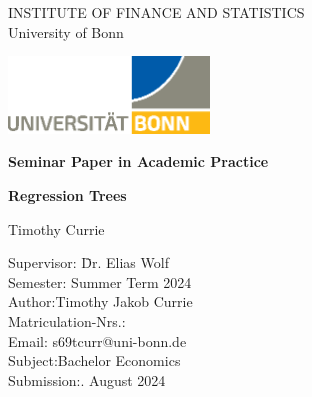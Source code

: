 \thispagestyle{empty}

\begin{center}

    \vspace*{-8mm}

    {\LARGE INSTITUTE OF FINANCE AND STATISTICS\\[1mm]}
    \large University of Bonn\\

    \vspace*{1cm}

    \includegraphics[width=0.4\textwidth]{./Graphics/UNI_Bonn_Logo_Standard_RZ.eps}

    \vspace*{1cm}

    {\Large \textbf{Seminar Paper in Academic Practice}}\\

    \vspace{1cm}

    {\Large \textbf{Regression Trees}}\\
    \vspace{1.5cm}

    {\LARGE Timothy Currie}\\[15mm]

    \parbox{120mm} {
        \begin{large}
            \begin{tabbing}
                Supervisor: \hspace{1.8cm} \= Dr. Elias Wolf\\[1.5mm]
                Semester:\> Summer Term 2024\\[1.5mm]
                Author:\>Timothy Jakob Currie\\[1.5mm] %
                Matriculation-Nrs.:\\[1.5mm]
                Email:\> s69tcurr@uni-bonn.de\\[1.5mm]
                Subject:\>Bachelor Economics\\[1.5mm]
                Submission:. August 2024\\[1.5mm]
            \end{tabbing}
        \end{large}
    }

\end{center}
\clearpage{\pagestyle{empty}\cleardoublepage}
